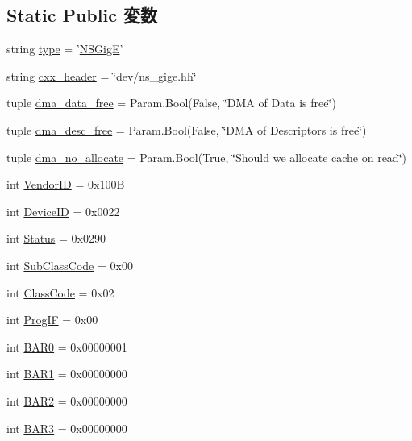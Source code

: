 \subsection*{Static Public 変数}
\begin{DoxyCompactItemize}
\item 
string \hyperlink{classEthernet_1_1NSGigE_acce15679d830831b0bbe8ebc2a60b2ca}{type} = '\hyperlink{classEthernet_1_1NSGigE}{NSGigE}'
\item 
string \hyperlink{classEthernet_1_1NSGigE_a17da7064bc5c518791f0c891eff05fda}{cxx\_\-header} = \char`\"{}dev/ns\_\-gige.hh\char`\"{}
\item 
tuple \hyperlink{classEthernet_1_1NSGigE_a22d1e790e1b7e65c12b7fdea7a31ea68}{dma\_\-data\_\-free} = Param.Bool(False, \char`\"{}DMA of Data is free\char`\"{})
\item 
tuple \hyperlink{classEthernet_1_1NSGigE_a6e202d51fe3c62be48597da296a25c5b}{dma\_\-desc\_\-free} = Param.Bool(False, \char`\"{}DMA of Descriptors is free\char`\"{})
\item 
tuple \hyperlink{classEthernet_1_1NSGigE_affae8158ec5ad5cadc42f91e14f2b920}{dma\_\-no\_\-allocate} = Param.Bool(True, \char`\"{}Should we allocate cache on read\char`\"{})
\item 
int \hyperlink{classEthernet_1_1NSGigE_a96ec1b4422f12f72160a0633ada47217}{VendorID} = 0x100B
\item 
int \hyperlink{classEthernet_1_1NSGigE_a4a8ed9a0233fc6d0ce178569c4de25d0}{DeviceID} = 0x0022
\item 
int \hyperlink{classEthernet_1_1NSGigE_ae58c2415cf1178457fa1254234c3f017}{Status} = 0x0290
\item 
int \hyperlink{classEthernet_1_1NSGigE_a6537e94b8ab06acd357673ec1699adc8}{SubClassCode} = 0x00
\item 
int \hyperlink{classEthernet_1_1NSGigE_a7d0125d1930fad943a6a7471da0317ad}{ClassCode} = 0x02
\item 
int \hyperlink{classEthernet_1_1NSGigE_aa63e82532e33e89795f472cfb7e0bb67}{ProgIF} = 0x00
\item 
int \hyperlink{classEthernet_1_1NSGigE_aa4b1656989a2151c14fc1d464df6531c}{BAR0} = 0x00000001
\item 
int \hyperlink{classEthernet_1_1NSGigE_a0d644194139bee13ebf45d34542c1dfa}{BAR1} = 0x00000000
\item 
int \hyperlink{classEthernet_1_1NSGigE_a0a6f9c88531fa1221329ec6903976a8b}{BAR2} = 0x00000000
\item 
int \hyperlink{classEthernet_1_1NSGigE_a0b8b6594cd17a42ee6f2bded401213d9}{BAR3} = 0x00000000

\end{DoxyCompactItemize}
